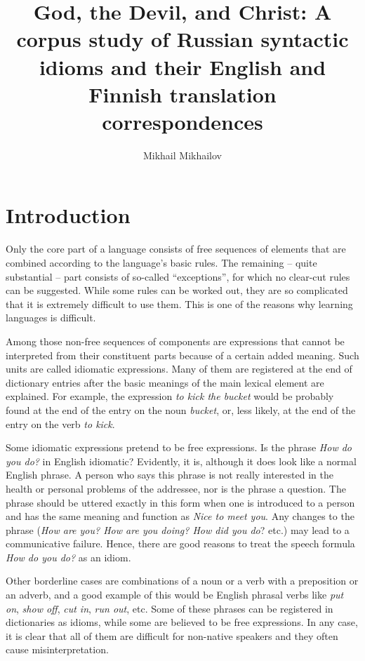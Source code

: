 \documentclass[output=paper]{langscibook}
\author{Mikhail Mikhailov\affiliation{Tampere University}}
\title[God, the Devil, and Christ]{God, the Devil, and Christ: A corpus study of Russian syntactic idioms and their English and Finnish translation correspondences}
\begin{document}
\maketitle 



\section{Introduction}

Only the core part of a language consists of free sequences of elements that are combined according to the language’s basic rules. The remaining – quite substantial – part consists of so-called “exceptions”, for which no clear-cut rules can be suggested. While some rules can be worked out, they are so complicated that it is extremely difficult to use them. This is one of the reasons why learning languages is difficult.

Among those non-free sequences of components are expressions that cannot be interpreted from their constituent parts because of a certain added meaning. Such units are called idiomatic expressions. Many of them are registered at the end of dictionary entries after the basic meanings of the main lexical element are explained. For example, the expression \textit{to kick the bucket} would be probably found at the end of the entry on the noun \textit{bucket}, or, less likely, at the end of the entry on the verb \textit{to kick}. 

Some idiomatic expressions pretend to be free expressions. Is the phrase \textit{How do you do?} in English idiomatic? Evidently, it is, although it does look like a normal English phrase. A person who says this phrase is not really interested in the health or personal problems of the addressee, nor is the phrase a question. The phrase should be uttered exactly in this form when one is introduced to a person and has the same meaning and function as \textit{Nice to meet you}. Any changes to the phrase (\textit{How are you? How are you doing? How did you do}? etc.) may lead to a communicative failure. Hence, there are good reasons to treat the speech formula \textit{How do you do?} as an idiom.

Other borderline cases are combinations of a noun or a verb with a preposition or an adverb, and a good example of this would be English phrasal verbs like \textit{put on}, \textit{show off}, \textit{cut in}, \textit{run out}, etc. Some of these phrases can be registered in dictionaries as idioms, while some are believed to be free expressions. In any case, it is clear that all of them are difficult for non-native speakers and they often cause misinterpretation.
\end{document}
